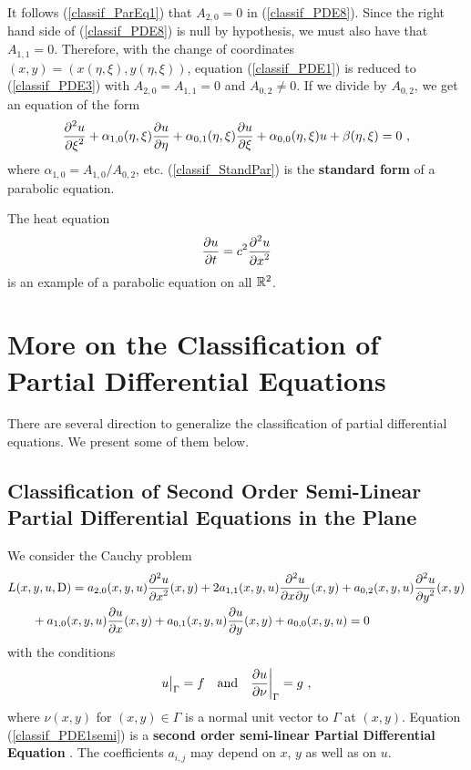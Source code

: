 It follows (\ref{classif_ParEq1}) that $A_{2,0}=0$ in
(\ref{classif_PDE8}).  Since the right hand side of
(\ref{classif_PDE8}) is null by hypothesis, we must also have that
$A_{1,1}=0$.
Therefore, with the change of coordinates $(x,y)=(x(\eta,\xi),y(\eta,\xi))$,
equation (\ref{classif_PDE1}) is reduced to
(\ref{classif_PDE3}) with $A_{2,0} = A_{1,1} = 0$ and $A_{0,2} \neq 0$.
If we divide by $A_{0,2}$, we get an equation of the form
\begin{equation} \label{classif_StandPar}
\frac{\displaystyle \partial^{2}{u}} {\displaystyle \partial \xi^{2}}
+ \alpha_{1,0}(\eta,\xi) \frac{\partial{u}}{\partial \eta}
+ \alpha_{0,1}(\eta,\xi) \frac{\partial{u}}{\partial \xi} + \alpha_{0,0}(\eta,\xi)u +
\beta (\eta,\xi) = 0 \  , 
\end{equation}
where $\displaystyle \alpha_{1,0} = A_{1,0}/A_{0,2}$, etc.
(\ref{classif_StandPar}) is the
{\bfseries standard form} of a parabolic equation.

\begin{egg}
The heat equation
\[
\frac{\partial{u}}{\partial t} = c^2 \frac{\displaystyle \partial^{2}{u}} {\displaystyle \partial x^{2}}
\]
is an example of a parabolic equation on all $\mathbb{R}^2$.
\end{egg}

\section{More on the Classification of Partial Differential
Equations}

There are several direction to generalize the classification of
partial differential equations.  We present some of them below.

\subsection{Classification of Second Order Semi-Linear Partial
Differential Equations in the Plane}

We consider the Cauchy problem
\begin{align}
& L(x,y,u,\diff) = a_{2,0}(x,y,u) \pdydxn{u}{x}{2}(x,y)
+ 2a_{1,1}(x,y,u) \pdydxnm{u}{x}{y}{2}{}{}(x,y)
+ a_{0,2}(x,y,u) \pdydxn{u}{y}{2}(x,y) \nonumber \\
&\qquad + a_{1,0}(x,y,u) \pdydx{u}{x}(x,y)
+ a_{0,1}(x,y,u) \pdydx{u}{y}(x,y) + a_{0,0}(x,y,u) = 0
\label{classif_PDE1semi}
\end{align}
with the conditions
\begin{equation} \label{classif_PDE1semi_cond}
u\big|_\Gamma = f \quad \text{and} \quad \frac{\partial{u}}{\partial \nu}\bigg|_\Gamma = g \  ,
\end{equation}
where $\nu(x,y)$ for $(x,y)\in \Gamma$ is a normal unit vector to
$\Gamma$ at $(x,y)$.  Equation (\ref{classif_PDE1semi}) is a
{\bfseries second order semi-linear Partial Differential Equation}%
.
The coefficients $a_{i,j}$ may depend on $x$, $y$ as well as on $u$.

